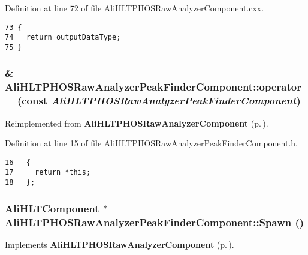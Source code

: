 Definition at line 72 of file Ali\-HLTPHOSRaw\-Analyzer\-Component.cxx.

\footnotesize\begin{verbatim}73 {
74   return outputDataType;
75 }
\end{verbatim}\normalsize 


\subsubsection{\& Ali\-HLTPHOSRaw\-Analyzer\-Peak\-Finder\-Component::operator= (const  {\em Ali\-HLTPHOSRaw\-Analyzer\-Peak\-Finder\-Component})\hspace{0.3cm}{\tt  [inline]}}\label{classAliHLTPHOSRawAnalyzerPeakFinderComponent_AliHLTPHOSRawAnalyzerPeakFinderComponenta3}




Reimplemented from {\bf Ali\-HLTPHOSRaw\-Analyzer\-Component} {\rm (p.\,\pageref{classAliHLTPHOSRawAnalyzerComponent_AliHLTPHOSRawAnalyzerComponenta3})}.

Definition at line 15 of file Ali\-HLTPHOSRaw\-Analyzer\-Peak\-Finder\-Component.h.

\footnotesize\begin{verbatim}16   {
17     return *this;
18   };
\end{verbatim}\normalsize 


\subsubsection{\setlength{\rightskip}{0pt plus 5cm}Ali\-HLTComponent $\ast$ Ali\-HLTPHOSRaw\-Analyzer\-Peak\-Finder\-Component::Spawn ()\hspace{0.3cm}{\tt  [virtual]}}\label{classAliHLTPHOSRawAnalyzerPeakFinderComponent_AliHLTPHOSRawAnalyzerPeakFinderComponenta5}




Implements {\bf Ali\-HLTPHOSRaw\-Analyzer\-Component} {\rm (p.\,\pageref{classAliHLTPHOSRawAnalyzerComponent_AliHLTPHOSRawAnalyzerComponenta11})}.

